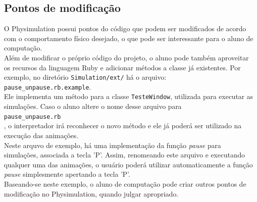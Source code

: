 \subsection{Pontos de modificação}

O Physimulation possui pontos do código que podem ser modificados de acordo com o comportamento físico desejado, o que pode ser interessante para o aluno de computação. \\

Além de modificar o próprio código do projeto, o aluno pode também aproveitar os recursos da linguagem Ruby e adicionar métodos a classe já existentes. Por exemplo, no diretório {\tt Simulation/ext/} há o arquivo: \\

  {\tt pause\_unpause.rb.example}. \\

\noindent Ele implementa um método para a classe {\tt TesteWindow}, utilizada para executar as simulações. Caso o aluno altere o nome desse arquivo para \\

  {\tt pause\_unpause.rb} \\

\noindent , o interpretador irá reconhecer o novo método e ele já poderá ser utilizado na execução das animações. \\

Neste arquvo de exemplo, há uma implementação da função \textit{pause} para simulações, associada a tecla 'P'. Assim, renomeando este arquivo e executando qualquer uma das animações, o usuário poderá utilizar automaticamente a função \textit{pause} simplesmente apertando a tecla 'P'. \\

Baseando-se neste exemplo, o aluno de computação pode criar outros pontos de modificação no Physimulation, quando julgar apropriado.

